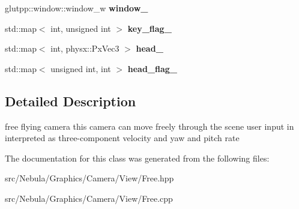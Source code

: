 \begin{DoxyCompactItemize}
\item 
\hypertarget{classglutpp_1_1Camera_1_1View_1_1Free_a94621c66a51dea55cb1f2a25b433b508}{glutpp\-::window\-::window\-\_\-w {\bfseries window\-\_\-}}\label{classglutpp_1_1Camera_1_1View_1_1Free_a94621c66a51dea55cb1f2a25b433b508}

\item 
\hypertarget{classglutpp_1_1Camera_1_1View_1_1Free_a53c1787f79a27ab556cd2ceebe00f217}{std\-::map$<$ int, unsigned int $>$ {\bfseries key\-\_\-flag\-\_\-}}\label{classglutpp_1_1Camera_1_1View_1_1Free_a53c1787f79a27ab556cd2ceebe00f217}

\item 
\hypertarget{classglutpp_1_1Camera_1_1View_1_1Free_ad757176778e811180c8591720eeef4a7}{std\-::map$<$ int, physx\-::\-Px\-Vec3 $>$ {\bfseries head\-\_\-}}\label{classglutpp_1_1Camera_1_1View_1_1Free_ad757176778e811180c8591720eeef4a7}

\item 
\hypertarget{classglutpp_1_1Camera_1_1View_1_1Free_aed05795815a16e4c315b7fe08340a511}{std\-::map$<$ unsigned int, int $>$ {\bfseries head\-\_\-flag\-\_\-}}\label{classglutpp_1_1Camera_1_1View_1_1Free_aed05795815a16e4c315b7fe08340a511}

\end{DoxyCompactItemize}


\subsection{\-Detailed \-Description}
free flying camera this camera can move freely through the scene user input in interpreted as three-\/component velocity and yaw and pitch rate 

\-The documentation for this class was generated from the following files\-:\begin{DoxyCompactItemize}
\item 
src/\-Nebula/\-Graphics/\-Camera/\-View/\-Free.\-hpp\item 
src/\-Nebula/\-Graphics/\-Camera/\-View/\-Free.\-cpp\end{DoxyCompactItemize}
